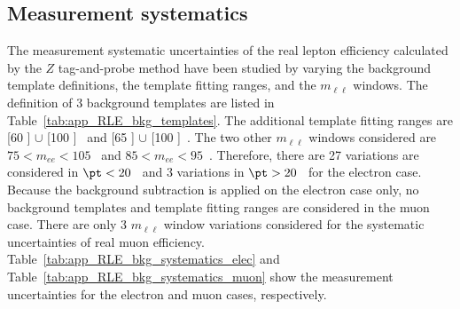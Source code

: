 \subsection{Measurement systematics}
\label{subsec:app_RLE_bkg_systematics}
The measurement systematic uncertainties of the real lepton efficiency calculated by the $Z$ tag-and-probe method have been studied by varying the background template definitions, the template fitting ranges, and the $m_{\ell \ell}$ windows.
The definition of 3 background templates are listed in Table~\ref{tab:app_RLE_bkg_templates}.
The additional template fitting ranges are [60 ] $\cup$ [100 ]~{\GeV} and [65 ] $\cup$ [100 ]~{\GeV}.
The two other $m_{\ell \ell}$ windows considered are $75 < m_{ee} < 105$~{\GeV} and $85 < m_{ee} < 95$~{\GeV}.
Therefore, there are 27 variations are considered in $\pt < 20$~{\GeV} and 3 variations in $\pt > 20$~{\GeV} for the electron case.
Because the background subtraction is applied on the electron case only, no background templates and template fitting ranges are considered in the muon case.
There are only 3 $m_{\ell \ell}$ window variations considered for the systematic uncertainties of real muon efficiency.
Table~\ref{tab:app_RLE_bkg_systematics_elec} and Table~\ref{tab:app_RLE_bkg_systematics_muon} show the measurement uncertainties for the electron and muon cases, respectively.

